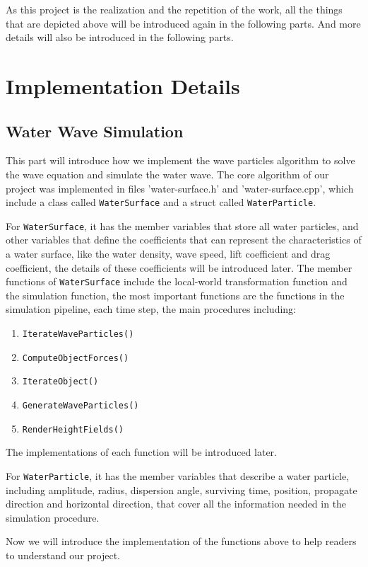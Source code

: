 \documentclass[acmtog]{acmart}
\begin{document}
As this project is the realization and the repetition of the work, all the things that are depicted above will be introduced again in the following parts. 
And more details will also be introduced in the following parts. 

\section{Implementation Details}
\subsection{Water Wave Simulation}
This part will introduce how we implement the wave particles algorithm to solve the wave equation and simulate the water wave.
The core algorithm of our project was implemented in files 'water-surface.h' and 'water-surface.cpp', which include a class called \verb|WaterSurface| and a struct called \verb|WaterParticle|.

For \verb|WaterSurface|, it has the member variables that store all water particles, and other variables that define the coefficients that can represent the characteristics of a water surface, like the water density, wave speed, lift coefficient and drag coefficient, the details of these coefficients will be introduced later.
The member functions of \verb|WaterSurface| include the local-world transformation function and the simulation function, the most important functions are the functions in the simulation pipeline, each time step, the main procedures including:
\begin{enumerate}
    \item \verb|IterateWaveParticles()| 
    \item \verb|ComputeObjectForces()| 
    \item \verb|IterateObject()| 
    \item \verb|GenerateWaveParticles()| 
    \item \verb|RenderHeightFields()|
\end{enumerate}
The implementations of each function will be introduced later. 

For \verb|WaterParticle|, it has the member variables that describe a water particle, including amplitude, radius, dispersion angle, surviving time, position, propagate direction and horizontal direction, that cover all the information needed in the simulation procedure.

Now we will introduce the implementation of the functions above to help readers to understand our project.
\end{document}
